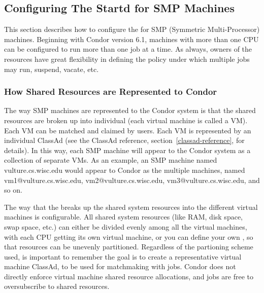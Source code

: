 \subsection{\label{sec:Configuring-SMP}
Configuring The Startd for SMP Machines}

This section describes how to configure the  for SMP
(Symmetric Multi-Processor) machines.
Beginning with Condor version 6.1, machines with more than one CPU can
be configured to run more than one job at a time.
As always, owners of the resources have great flexibility in defining
the policy under which multiple jobs may run, suspend, vacate, etc.  

\subsubsection{\label{sec:How-Resources-Represented}
How Shared Resources are Represented to Condor}

The way SMP machines are represented to the Condor system is that
the shared resources are broken up into individual  (each virtual machine is called a VM).
Each VM can be matched and claimed by users.
Each VM is represented by an individual ClassAd
(see the ClassAd reference, section~\ref{classad-reference}, for
details). 
In this way, each SMP machine will appear to the Condor system as
a collection of separate VMs.  
As an example, an SMP machine named
vulture.cs.wisc.edu would appear to Condor as the
multiple machines, named vm1@vulture.cs.wisc.edu,
vm2@vulture.cs.wisc.edu,
vm3@vulture.cs.wisc.edu, and so on.

The way that the  breaks up the
shared system resources into the different virtual machines  
is configurable.
All shared system resources (like RAM, disk space, swap space, etc.)
can either be divided evenly among all the virtual machines, with each
CPU getting its own virtual machine, or you can define your own
, so that resources can be unevenly
partitioned.  Regardless of the partioning scheme used, is important
to remember the goal is to create a representative virtual machine
ClassAd, to be used for matchmaking with jobs.  Condor does not
directly enforce virtual machine shared resource allocations, and jobs
are free to oversubscribe to shared resources.

